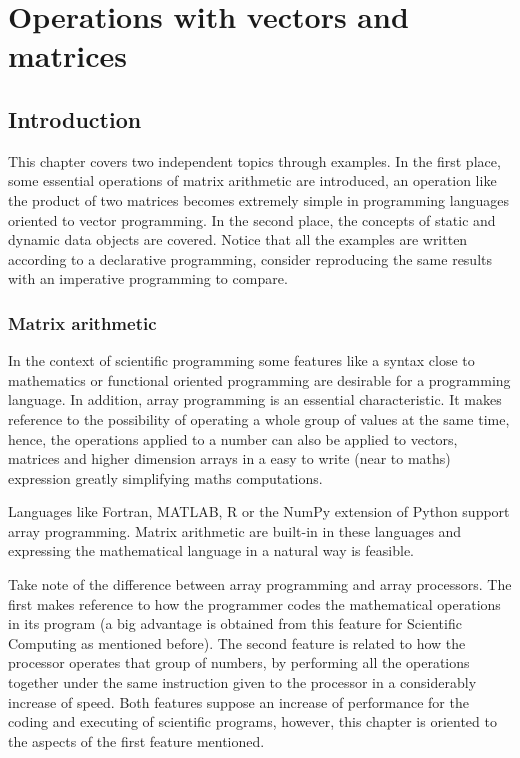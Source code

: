 \chapter{Operations with vectors and matrices} 



\section{Introduction}

This chapter covers two independent topics through examples. In the first place, some essential 
operations of matrix arithmetic are introduced, an operation like the product of two matrices becomes 
extremely simple in programming languages oriented to vector programming. 
In the second place, the concepts of static and dynamic 
data objects are covered. Notice that all the examples are written according to a 
declarative programming, consider reproducing the same results with an imperative programming to 
compare.
    
    \vspace{-.5cm}
    \subsection*{Matrix arithmetic}

In the context of scientific programming some features like a syntax close to mathematics or
functional oriented programming are desirable for a programming language. In addition, 
array programming is an essential characteristic. It makes
reference to the possibility of operating a whole group of values at the same time, hence, 
the operations applied to a number can also be applied to vectors, matrices and higher dimension arrays
in a easy to write (near to maths) expression greatly simplifying maths computations.
 
Languages like Fortran, MATLAB, R or the NumPy extension of Python support array programming.
Matrix arithmetic are built-in in these languages and expressing the mathematical language in a natural way is feasible.

Take note of the difference between array programming and array processors. The first makes reference to how the programmer 
codes the mathematical operations in its program (a big advantage is obtained from this feature for Scientific Computing as mentioned before). 
The second feature is related to how the processor operates that group of numbers, by performing
all the operations together under the same instruction given to the processor in a considerably increase of speed.
Both features suppose an increase of performance for the coding and executing of scientific programs, however, this chapter is 
oriented to the aspects of the first feature mentioned. 

